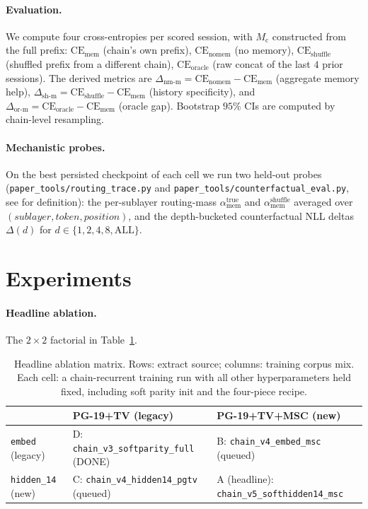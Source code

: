 \documentclass{article}
\newcommand{\Mc}{M_{\text{c}}}
\newcommand{\dnm}{\Delta_{\text{nm-m}}}
\newcommand{\dsh}{\Delta_{\text{sh-m}}}
\newcommand{\dor}{\Delta_{\text{or-m}}}
\newcommand{\CEmem}{\mathrm{CE}_{\text{mem}}}
\newcommand{\CEnomem}{\mathrm{CE}_{\text{nomem}}}
\newcommand{\CEsh}{\mathrm{CE}_{\text{shuffle}}}
\newcommand{\CEor}{\mathrm{CE}_{\text{oracle}}}
\newcommand{\amem}{\alpha_{\text{mem}}}
\begin{document}
\paragraph{Evaluation.} We compute four cross-entropies per scored
session, with $\Mc$ constructed from the full prefix:
$\CEmem$ (chain's own prefix), $\CEnomem$ (no memory), $\CEsh$
(shuffled prefix from a different chain), $\CEor$ (raw concat of
the last $4$ prior sessions). The derived metrics are
$\dnm = \CEnomem - \CEmem$ (aggregate memory help),
$\dsh = \CEsh - \CEmem$ (history specificity), and
$\dor = \CEor - \CEmem$ (oracle gap). Bootstrap $95\%$ CIs are
computed by chain-level resampling.

\paragraph{Mechanistic probes.} On the best persisted checkpoint of
each cell we run two held-out probes
(\texttt{paper\_tools/routing\_trace.py} and
\texttt{paper\_tools/counterfactual\_eval.py}, see
\cite{liu2025drop} for definition): the per-sublayer routing-mass
$\amem^{\text{true}}$ and $\amem^{\text{shuffle}}$ averaged over
$(sublayer, token, position)$, and the depth-bucketed
counterfactual NLL deltas $\Delta(d)$ for $d \in \{1, 2, 4, 8,
\mathrm{ALL}\}$.

\section{Experiments}
\label{sec:experiments}

\paragraph{Headline ablation.} The $2\!\times\!2$ factorial in
Table~\ref{tab:headline_grid}.

\begin{table}[t]
\centering
\caption{Headline ablation matrix. Rows: extract source; columns:
training corpus mix. Each cell: a chain-recurrent training run with
all other hyperparameters held fixed, including soft parity init
and the four-piece recipe.}
\label{tab:headline_grid}
\small
\begin{tabular}{lll}
\toprule
                & \textsc{PG-19+TV} (legacy) & \textsc{PG-19+TV+MSC} (new) \\
\midrule
\texttt{embed} (legacy)        & D: \texttt{chain\_v3\_softparity\_full} (DONE)  & B: \texttt{chain\_v4\_embed\_msc} (queued) \\
\texttt{hidden\_14} (new)      & C: \texttt{chain\_v4\_hidden14\_pgtv} (queued)  & A (headline): \texttt{chain\_v5\_softhidden14\_msc} \\
\bottomrule
\end{tabular}
\end{table}
\end{document}
